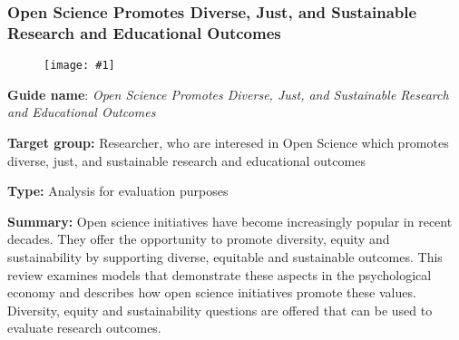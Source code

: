 \documentclass{article}
\newlength{\imgwidth}
\newcommand\scaledgraphics[2]{%
                
\settowidth{\imgwidth}{\texttt{[image: \#1]}}%
                
\setlength{\imgwidth}{\minof{\imgwidth}{#2\textwidth}}%
                
\texttt{[image: \#1]}%
                
}
\begin{document}
\subsubsection{Open Science Promotes Diverse, Just, and Sustainable Research and Educational Outcomes}\label{H4807510}



\begin{center}
\begin{figure}
\scaledgraphics{23f9ee73-dda2-4a56-8083-4a618f9983b9.png}{0.75}
\label{F46402811}
\end{figure}


\end{center}


\textbf{Guide name}: \emph{Open Science Promotes Diverse, Just, and Sustainable Research and Educational Outcomes} \autocite{grahe_open_2019}


\textbf{Target group: }Researcher, who are interesed in Open Science which promotes diverse, just, and sustainable research and educational outcomes


\textbf{Type: }Analysis for evaluation purposes


\textbf{Summary:} Open science initiatives have become increasingly popular in recent decades. They offer the opportunity to promote diversity, equity and sustainability by supporting diverse, equitable and sustainable outcomes. This review examines models that demonstrate these aspects in the psychological economy and describes how open science initiatives promote these values. Diversity, equity and sustainability questions are offered that can be used to evaluate research outcomes.


\printbibliography[title={Bibliography}]
\end{document}
